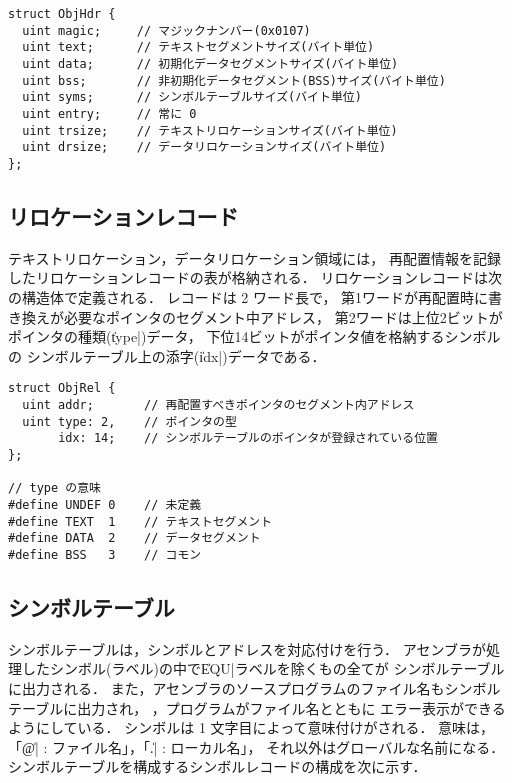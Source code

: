\begin{lstlisting}[numbers=none,float=htb]
struct ObjHdr {
  uint magic;     // マジックナンバー(0x0107)
  uint text;      // テキストセグメントサイズ(バイト単位)
  uint data;      // 初期化データセグメントサイズ(バイト単位)
  uint bss;       // 非初期化データセグメント(BSS)サイズ(バイト単位)
  uint syms;      // シンボルテーブルサイズ(バイト単位)
  uint entry;     // 常に 0
  uint trsize;    // テキストリロケーションサイズ(バイト単位)
  uint drsize;    // データリロケーションサイズ(バイト単位)
};
\end{lstlisting}

\subsection{リロケーションレコード}
テキストリロケーション，データリロケーション領域には，
再配置情報を記録したリロケーションレコードの表が格納される．
リロケーションレコードは次の構造体で定義される．
レコードは 2 ワード長で，
第1ワードが再配置時に書き換えが必要なポインタのセグメント中アドレス，
第2ワードは上位2ビットがポインタの種類(\|type|)データ，
下位14ビットがポインタ値を格納するシンボルの
シンボルテーブル上の添字(\|idx|)データである．

\begin{lstlisting}[numbers=none,float=htb]
struct ObjRel {
  uint addr;       // 再配置すべきポインタのセグメント内アドレス
  uint type: 2,    // ポインタの型
       idx: 14;    // シンボルテーブルのポインタが登録されている位置
};

// type の意味
#define UNDEF 0    // 未定義
#define TEXT  1    // テキストセグメント
#define DATA  2    // データセグメント
#define BSS   3    // コモン
\end{lstlisting}

\subsection{シンボルテーブル}
シンボルテーブルは，シンボルとアドレスを対応付けを行う．
アセンブラが処理したシンボル(ラベル)の中で\|EQU|ラベルを除くもの全てが
シンボルテーブルに出力される．
また，アセンブラのソースプログラムのファイル名もシンボルテーブルに出力され，
{\objexe}，{\objbin}プログラムがファイル名とともに
エラー表示ができるようにしている．
シンボルは 1 文字目によって意味付けがされる．
意味は，「\|@| : ファイル名」，「\|.| : ローカル名」，
それ以外はグローバルな名前になる．
シンボルテーブルを構成するシンボルレコードの構成を次に示す．

